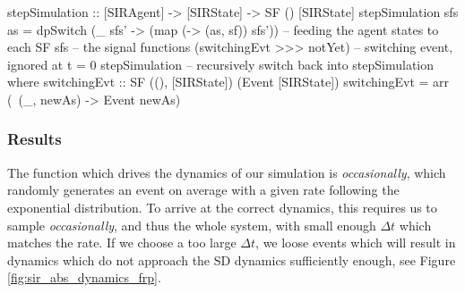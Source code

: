 \begin{HaskellCode}
stepSimulation :: [SIRAgent] -> [SIRState] -> SF () [SIRState]
stepSimulation sfs as =
    dpSwitch
      (\_ sfs' -> (map (\sf -> (as, sf)) sfs')) -- feeding the agent states to each SF
      sfs                                       -- the signal functions
      (switchingEvt >>> notYet)                 -- switching event, ignored at t = 0
      stepSimulation                            -- recursively switch back into stepSimulation
  where
    switchingEvt :: SF ((), [SIRState]) (Event [SIRState])
    switchingEvt = arr (\ (_, newAs) -> Event newAs)
\end{HaskellCode}

\subsubsection{Results}
The function which drives the dynamics of our simulation is \textit{occasionally}, which randomly generates an event on average with a given rate following the exponential distribution. To arrive at the correct dynamics, this requires us to sample \textit{occasionally}, and thus the whole system, with small enough $\Delta t$ which matches the rate. If we choose a too large $\Delta t$, we loose events which will result in dynamics which do not approach the SD dynamics sufficiently enough, see Figure \ref{fig:sir_abs_dynamics_frp}.

